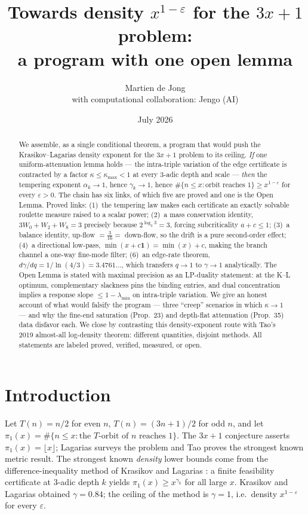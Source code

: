 \documentclass[11pt]{article}
\title{Towards density $x^{1-\varepsilon}$ for the $3x+1$ problem:\\
a program with one open lemma}
\author{Martien de Jong\\[3pt]
{\normalsize with computational collaboration: Jengo (AI)}}
\date{July 2026}
\theoremstyle{definition}
\theoremstyle{remark}
\newcommand{\lam}{\lambda}
\newcommand{\gam}{\gamma}
\newcommand{\kap}{\kappa}
\begin{document}
\maketitle

\begin{abstract}
We assemble, as a single conditional theorem, a program that would push the
Krasikov--Lagarias density exponent for the $3x+1$ problem to its ceiling.
\emph{If} one uniform-attenuation lemma holds --- the intra-triple variation
of the edge certificate is contracted by a factor $\kap \leq \kap_{\max} < 1$
at every $3$-adic depth and scale --- \emph{then} the tempering exponent
$\alpha_k \to 1$, hence $\gam_k \to 1$, hence
$\#\{ n \leq x : \text{orbit reaches } 1\} \geq x^{1-\varepsilon}$ for every
$\varepsilon > 0$. The chain has six links, of which five are proved and one is
the Open Lemma. Proved links: (1)~the tempering law makes each certificate an
exactly solvable roulette measure raised to a scalar power; (2)~a mass
conservation identity, $3W_0 + W_2 + W_8 = 3$ precisely because
$2^{\log_2 3} = 3$, forcing subcriticality $a + c \leq 1$; (3)~a balance
identity, up-flow $= \tfrac{3}{16} =$ down-flow, so the drift is a pure
second-order effect; (4)~a directional low-pass, $\min(x + c\mathbf 1) =
\min(x) + c$, making the branch channel a one-way fine-mode filter; (6)~an
edge-rate theorem, $d\gam/dq = 1/\ln(4/3) = 3.4761\ldots$, which transfers
$q \to 1$ to $\gam \to 1$ analytically. The Open Lemma is stated with maximal
precision as an LP-duality statement: at the K--L optimum, complementary
slackness pins the binding entries, and dual concentration implies a response
slope $\leq 1 - \lam_{\min}$ on intra-triple variation. We give an honest
account of what would falsify the program --- three ``creep'' scenarios in
which $\kap \to 1$ --- and why the fine-end saturation (Prop.~23) and
depth-flat attenuation (Prop.~35) data disfavor each. We close by contrasting
this density-exponent route with Tao's 2019 almost-all log-density theorem:
different quantities, disjoint methods. All statements are labeled proved,
verified, measured, or open.
\end{abstract}

\section{Introduction}
\label{sec:intro}

Let $T(n) = n/2$ for even $n$, $T(n) = (3n+1)/2$ for odd $n$, and let
$\pi_1(x) = \#\{ n \leq x : \text{the } T\text{-orbit of } n \text{ reaches } 1\}$.
The $3x+1$ conjecture asserts $\pi_1(x) = \lfloor x \rfloor$; Lagarias
\cite{Lag85} surveys the problem and Tao \cite{Tao19} proves the strongest
known metric result. The strongest known \emph{density} lower bounds come from
the difference-inequality method of Krasikov and Lagarias \cite{KL03}: a finite
feasibility certificate at $3$-adic depth $k$ yields
$\pi_1(x) \geq x^{\gam_k}$ for all large $x$. Krasikov and Lagarias obtained
$\gam = 0.84$; the ceiling of the method is $\gam = 1$, i.e.\ density
$x^{1-\varepsilon}$ for every $\varepsilon$.
\end{document}
